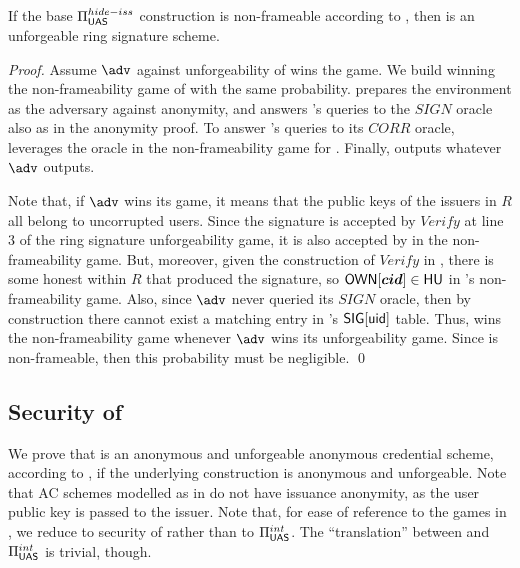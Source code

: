 \begin{theorem}
  If the base $\Pi_{\mathsf{UAS}}^{hide-iss}$ construction is non-frameable according to
  , then \CUASRing is an unforgeable ring signature
  scheme.
\end{theorem}

\begin{proof}
  Assume $\adv$ against unforgeability of \CUASRing wins the game. We build
  \advB winning the non-frameability game of \CUASGen with the same probability.
  \advB prepares the environment as the adversary \advB against anonymity,
  and answers \adv's queries to the $SIGN$ oracle also as in the anonymity
  proof. To answer \adv's queries to its $CORR$ oracle, \advB leverages the
  \ICORR oracle in the non-frameability game for \UAS. Finally, \advB outputs
  whatever $\adv$ outputs.

  Note that, if $\adv$ wins its game, it means that the public keys of the
  issuers in $R$ all belong to uncorrupted users. Since the signature is
  accepted by $Verify$ at line 3 of the ring signature unforgeability game,
  it is also accepted by \Verify in the \UAS non-frameability game. But,
  moreover, given the construction of $Verify$ in \CUASRing, there is some
  honest \usk within $R$ that produced the signature, so $\mathsf{OWN}[\boldsymbol{cid}] \in \mathsf{HU}$
  in \advB's non-frameability game. Also, since $\adv$ never queried its $SIGN$
  oracle, then by construction there cannot exist a matching entry in \advB's
  $\mathsf{SIG}[\mathsf{uid}]$ table. Thus, \advB wins the non-frameability game whenever
  $\adv$ wins its unforgeability game. Since \CUASGen is non-frameable, then
  this probability must be negligible.
  \qed
\end{proof}

\subsection{Security of \CUASAC}

We prove that \CUASAC is an anonymous and unforgeable anonymous credential
scheme, according to \cite{fhs19}, if the underlying \CUASGen construction
is anonymous and unforgeable. Note that AC schemes modelled as in \cite{fhs19}
do not have issuance anonymity, as the user public key is passed to the issuer.
Note that, for ease of reference to the games in , we
reduce to security of \CUASGen rather than to $\Pi_{\mathsf{UAS}}^{int}$. The
``translation'' between \CUASGen and $\Pi_{\mathsf{UAS}}^{int}$ is trivial, though.

